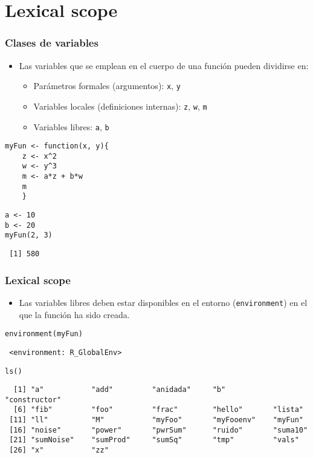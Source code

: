 \documentclass[xcolor={usenames,svgnames,dvipsnames}]{beamer}
\begin{document}
\section{Lexical scope}
\label{sec-2}
\begin{frame}[fragile]
\frametitle{Clases de variables}
\label{sec-2-1}

\begin{itemize}
\item Las variables que se emplean en el cuerpo de una función pueden
  dividirse en:
\begin{itemize}
\item Parámetros formales (argumentos): \texttt{x}, \texttt{y}
\item Variables locales (definiciones internas): \texttt{z}, \texttt{w}, \texttt{m}
\item Variables libres: \texttt{a}, \texttt{b}
\end{itemize}
\end{itemize}

\lstset{language=R}
\begin{lstlisting}
myFun <- function(x, y){
    z <- x^2
    w <- y^3
    m <- a*z + b*w
    m
    }
\end{lstlisting}



\lstset{language=R}
\begin{lstlisting}
a <- 10
b <- 20
myFun(2, 3)
\end{lstlisting}

\begin{verbatim}
 [1] 580
\end{verbatim}
\end{frame}
\begin{frame}[fragile]
\frametitle{Lexical scope}
\label{sec-2-2}


\begin{itemize}
\item Las variables libres deben estar disponibles en el entorno
  (\texttt{environment}) en el que la función ha sido creada.
\end{itemize}

\lstset{language=R}
\begin{lstlisting}
environment(myFun)
\end{lstlisting}

\begin{verbatim}
 <environment: R_GlobalEnv>
\end{verbatim}


\lstset{language=R}
\begin{lstlisting}
ls()
\end{lstlisting}

\begin{verbatim}
  [1] "a"           "add"         "anidada"     "b"           "constructor"
  [6] "fib"         "foo"         "frac"        "hello"       "lista"      
 [11] "ll"          "M"           "myFoo"       "myFooenv"    "myFun"      
 [16] "noise"       "power"       "pwrSum"      "ruido"       "suma10"     
 [21] "sumNoise"    "sumProd"     "sumSq"       "tmp"         "vals"       
 [26] "x"           "zz"
\end{verbatim}
\end{frame}
\end{document}
